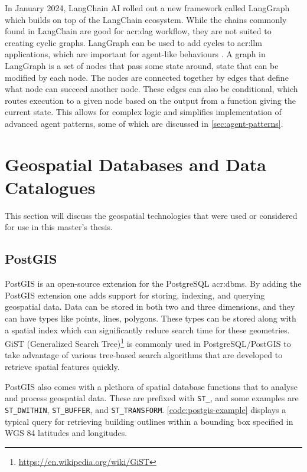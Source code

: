 In January 2024, LangChain AI rolled out a new framework called LangGraph which builds on top of the LangChain ecosystem. While the chains commonly found in LangChain are good for \gls{acr:dag} workflow, they are not suited to creating cyclic graphs. LangGraph can be used to add cycles to \acrshort{acr:llm} applications, which are important for agent-like behaviours \citep{langchainaiLangchainaiLanggraph2024}. A graph in LangGraph is a set of nodes that pass some state around, state that can be modified by each node. The nodes are connected together by edges that define what node can succeed another node. These edges can also be conditional, which routes execution to a given node based on the output from a function giving the current state. This allows for complex logic and simplifies implementation of advanced agent patterns, some of which are discussed in \autoref{sec:agent-patterns}.


\section{Geospatial Databases and Data Catalogues}
\label{sec:geo-dbs-and-data-catalogues}

This section will discuss the geospatial technologies that were used or considered for use in this master's thesis.

\subsection{PostGIS}
\label{subsec:postgis}

PostGIS \citep{PostGIS2001} is an open-source extension for the PostgreSQL \acrshort{acr:dbms}. By adding the PostGIS extension one adds support for storing, indexing, and querying geospatial data. Data can be stored in both two and three dimensions, and they can have types like points, lines, polygons. These types can be stored along with a spatial index which can significantly reduce search time for these geometries. GiST (Generalized Search Tree)\footnote{\url{https://en.wikipedia.org/wiki/GiST}} is commonly used in PostgreSQL/PostGIS to take advantage of various tree-based search algorithms that are developed to retrieve spatial features quickly.

PostGIS also comes with a plethora of spatial database functions that to analyse and process geospatial data. These are prefixed with \texttt{ST\_}, and some examples are \texttt{ST\_DWITHIN}, \texttt{ST\_BUFFER}, and \texttt{ST\_TRANSFORM}. \autoref{code:postgis-example} displays a typical query for retrieving building outlines within a bounding box specified in WGS 84 latitudes and longitudes.

